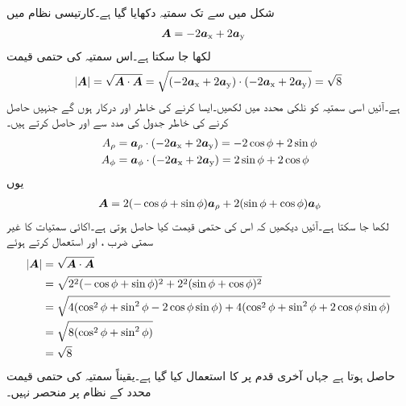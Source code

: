 شکل  میں  سے  تک سمتیہ  دکھایا گیا ہے۔کارتیسی نظام میں 
\begin{align}\label{مساوات_سمتیہ_کارتیسی_نظام_سمتیہ_مثال}
{\ensuremath{{\boldsymbol{A}}}}&=-2{\boldsymbol{a}}_{\textup{x}}+2{\boldsymbol{a}}_{\textup{y}}
\end{align}
لکھا جا سکتا ہے۔اس سمتیہ کی حتمی قیمت
\begin{align*}
\abs{{{\boldsymbol{A}}}}= \sqrt{{{\boldsymbol{A}}} \cdot {\ensuremath{{\boldsymbol{A}}}}}=\sqrt{(-2{\boldsymbol{a}}_{\textup{x}}+2{\boldsymbol{a}}_{\textup{y}}) \cdot (-2{\boldsymbol{a}}_{\textup{x}}+2{\boldsymbol{a}}_{\textup{y}})}=\sqrt{8}
\end{align*}
ہے۔آئیں اسی سمتیہ کو نلکی محدد میں لکھیں۔ایسا کرنے کی خاطر  اور  درکار ہوں گے جنہیں حاصل کرنے کی خاطر جدول   کی مدد سے  اور  حاصل کرتے ہیں۔
\begin{align*}
A_\rho&={\boldsymbol{a}}_{\rho} \cdot (-2{\boldsymbol{a}}_{\textup{x}}+2{\boldsymbol{a}}_{\textup{y}})=-2 \cos \phi +2 \sin \phi\\
A_\phi&={\boldsymbol{a}}_{\phi} \cdot  (-2{\boldsymbol{a}}_{\textup{x}}+2{\boldsymbol{a}}_{\textup{y}})=2 \sin \phi +2 \cos \phi
\end{align*}
یوں
\begin{align}\label{مساوات_سمتیہ_نلکی_نظام_سمتیہ_مثال}
{\ensuremath{{\boldsymbol{A}}}}=2(- \cos \phi + \sin \phi) {\boldsymbol{a}}_{\rho} +2( \sin \phi + \cos \phi){\boldsymbol{a}}_{\phi}
\end{align}
لکھا جا سکتا ہے۔آئیں دیکھیں کہ اس کی حتمی قیمت کیا حاصل ہوتی ہے۔اکائی سمتیات کا غیر سمتی ضرب ،  اور  استعمال کرتے ہوئے
\begin{align*}
\abs{{{\boldsymbol{A}}}}&=\sqrt{{{\boldsymbol{A}}} \cdot {\ensuremath{{\boldsymbol{A}}}}}\\
&=\sqrt{2^2(- \cos \phi + \sin \phi)^2+2^2( \sin \phi + \cos \phi)^2 }\\
&=\sqrt{4(\cos^2 \phi +\sin^2 \phi -2 \cos \phi \sin \phi)+4(\cos^2 \phi +\sin^2 \phi +2 \cos \phi \sin \phi)}\\
&=\sqrt{8(\cos^2 \phi+\sin^2 \phi)}\\
&=\sqrt{8}
\end{align*}
حاصل ہوتا ہے جہاں آخری قدم پر  کا استعمال کیا گیا ہے۔یقیناً سمتیہ کی حتمی قیمت محدد کے نظام پر منحصر نہیں۔

